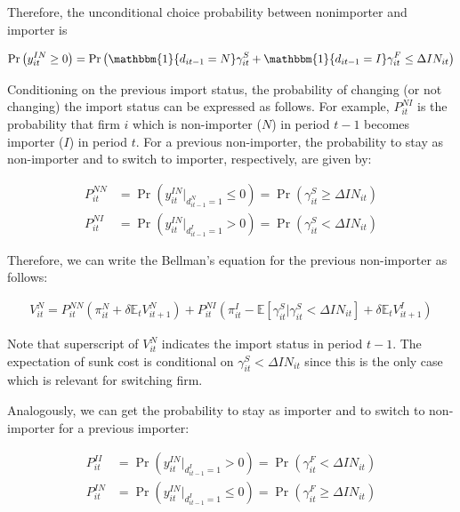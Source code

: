 \documentclass[11pt,letter]{article}
\newcommand{\Ind}[1]{\mathbbm{1}\{{#1}\}}
\newcommand{\prn}[1]{\left({#1}\right)}
\newcommand{\lprn}[1]{\left[{#1}\right]}
\begin{document}
\begin{appendices}
Therefore, the unconditional choice probability between nonimporter and importer is 

\begin{align}
\Pr\prn{y_{it}^{IN}\geq 0} = \Pr \prn{\Ind{d_{it-1}=N}\gamma_{it}^S  + \Ind{d_{it-1}=I}\gamma_{it}^F\leq \Delta IN_{it}}
\end{align}

Conditioning on the previous import status, the probability of changing (or not changing) the import status can be expressed as follows. For example, $P_{it}^{NI}$ is the probability that firm $i$ which is non-importer ($N$) in period $t-1$ becomes importer ($I$) in period $t$. For a previous non-importer, the probability to stay as non-importer and to switch to importer, respectively, are given by: 

\begin{align}
P_{it}^{NN} &= \Pr\prn{y_{it}^{IN}|_{d_{it-1}^N=1} \leq 0} = \Pr \prn{\gamma_{it}^S \geq \Delta IN_{it} } \nonumber\\
P_{it}^{NI} &= \Pr\prn{y_{it}^{IN}|_{d_{it-1}^I=1} > 0} = \Pr \prn{\gamma_{it}^S < \Delta IN_{it} }\label{choiceprobnon}
\end{align}

\noindent Therefore, we can write the Bellman's equation for the previous non-importer as follows:

\begin{align}
V_{it}^N = P_{it}^{NN}\prn{\pi_{it}^N  + \delta \mathbb{E}_t V_{it+1}^N} +  P_{it}^{NI}\prn{\pi_{it}^I -\mathbb{E}\lprn{\gamma_{it}^S|\gamma_{it}^S < \Delta IN_{it}} + \delta \mathbb{E}_t V_{it+1}^I} \label{Bellmannon}
\end{align}

\noindent Note that superscript of $V_{it}^N$ indicates the import status in period $t-1$. The expectation of sunk cost is conditional on $\gamma_{it}^S < \Delta IN_{it}$ since this is the only case which is relevant for switching firm.

Analogously, we can get the probability to stay as importer and to switch to non-importer for a previous importer:

\begin{align}
P_{it}^{II} &= \Pr\prn{y_{it}^{IN}|_{d_{it-1}^I=1} > 0} = \Pr \prn{\gamma_{it}^F < \Delta IN_{it} }\nonumber\\
P_{it}^{IN} &= \Pr\prn{y_{it}^{IN}|_{d_{it-1}^I=1} \leq 0} = \Pr \prn{\gamma_{it}^F \geq \Delta IN_{it} }\label{choiceprobimp}
\end{align}


\end{appendices}
\end{document}
